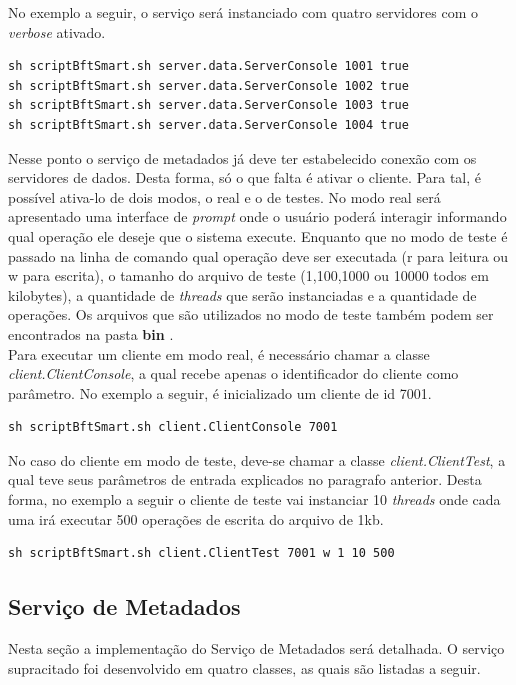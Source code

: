 No exemplo a seguir, o serviço será instanciado com quatro servidores com o \textit{verbose} ativado.

\begin{lstlisting}
sh scriptBftSmart.sh server.data.ServerConsole 1001 true
sh scriptBftSmart.sh server.data.ServerConsole 1002 true
sh scriptBftSmart.sh server.data.ServerConsole 1003 true
sh scriptBftSmart.sh server.data.ServerConsole 1004 true
\end{lstlisting}

Nesse ponto o serviço de metadados já deve ter estabelecido conexão com os servidores de dados. Desta forma, só o que falta é ativar o cliente. Para tal, é possível ativa-lo de dois modos, o real e o de testes. No modo real será apresentado uma interface de \textit{prompt} onde o usuário poderá interagir informando qual operação ele deseje que o sistema execute. Enquanto que no modo de teste é passado na linha de comando qual operação deve ser executada (r para leitura ou w para escrita), o tamanho do arquivo de teste (1,100,1000 ou 10000 todos em kilobytes), a quantidade de \textit{threads} que serão instanciadas e a quantidade de operações. Os arquivos que são utilizados no modo de teste também podem ser encontrados na pasta \textbf{bin }.
\\

Para executar um cliente em modo real, é necessário chamar a classe \textit{client.ClientConsole}, a qual recebe apenas o identificador do cliente como parâmetro. No exemplo a seguir, é inicializado um cliente de id 7001.
\\

\begin{lstlisting}
sh scriptBftSmart.sh client.ClientConsole 7001
\end{lstlisting}

No caso do cliente em modo de teste, deve-se chamar a classe \textit{client.ClientTest}, a qual teve seus parâmetros de entrada explicados no paragrafo anterior. Desta forma, no exemplo a seguir o cliente de teste vai instanciar 10 \textit{threads} onde cada uma irá executar 500 operações de escrita do arquivo de 1kb.

\begin{lstlisting}
sh scriptBftSmart.sh client.ClientTest 7001 w 1 10 500
\end{lstlisting}
	
\subsection{Serviço de Metadados}
Nesta seção a implementação do Serviço de Metadados será detalhada. O serviço supracitado foi desenvolvido em quatro classes, as quais são listadas a seguir.
\\

